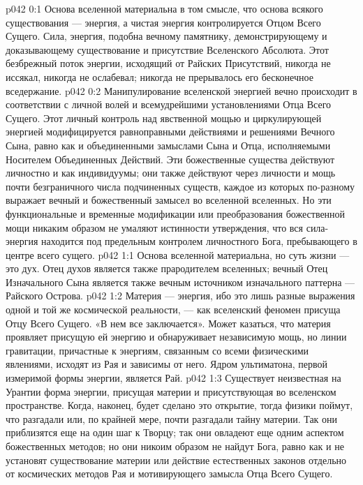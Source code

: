 \author{Могучий Вестник}
\vs p042 0:1 Основа вселенной материальна в том смысле, что основа всякого существования --- энергия, а чистая энергия контролируется Отцом Всего Сущего. Сила, энергия, подобна вечному памятнику, демонстрирующему и доказывающему существование и присутствие Вселенского Абсолюта. Этот безбрежный поток энергии, исходящий от Райских Присутствий, никогда не иссякал, никогда не ослабевал; никогда не прерывалось его бесконечное вседержание.
\vs p042 0:2 Манипулирование вселенской энергией вечно происходит в соответствии с личной волей и всемудрейшими установлениями Отца Всего Сущего. Этот личный контроль над явственной мощью и циркулирующей энергией модифицируется равноправными действиями и решениями Вечного Сына, равно как и объединенными замыслами Сына и Отца, исполняемыми Носителем Объединенных Действий. Эти божественные существа действуют личностно и как индивидуумы; они также действуют через личности и мощь почти безграничного числа подчиненных существ, каждое из которых по\hyp{}разному выражает вечный и божественный замысел во вселенной вселенных. Но эти функциональные и временные модификации или преобразования божественной мощи никаким образом не умаляют истинности утверждения, что вся сила\hyp{}энергия находится под предельным контролем личностного Бога, пребывающего в центре всего сущего.
\vs p042 1:1 Основа вселенной материальна, но суть жизни --- это дух. Отец духов является также прародителем вселенных; вечный Отец Изначального Сына является также вечным источником изначального паттерна --- Райского Острова.
\vs p042 1:2 Материя --- энергия, ибо это лишь разные выражения одной и той же космической реальности, --- как вселенский феномен присуща Отцу Всего Сущего. «В нем все заключается». Может казаться, что материя проявляет присущую ей энергию и обнаруживает независимую мощь, но линии гравитации, причастные к энергиям, связанным со всеми физическими явлениями, исходят из Рая и зависимы от него. Ядром ультиматона, первой измеримой формы энергии, является Рай.
\vs p042 1:3 \pc Существует неизвестная на Урантии форма энергии, присущая материи и присутствующая во вселенском пространстве. Когда, наконец, будет сделано это открытие, тогда физики поймут, что разгадали или, по крайней мере, почти разгадали тайну материи. Так они приблизятся еще на один шаг к Творцу; так они овладеют еще одним аспектом божественных методов; но они никоим образом не найдут Бога, равно как и не установят существование материи или действие естественных законов отдельно от космических методов Рая и мотивирующего замысла Отца Всего Сущего.
